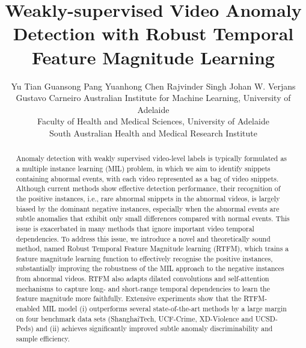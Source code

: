\documentclass[10pt,twocolumn,letterpaper]{article}
\begin{document}
\title{Weakly-supervised Video Anomaly Detection with Robust Temporal Feature Magnitude Learning} 

\author{\parbox{0.7\linewidth}{\centering Yu Tian      Guansong Pang  Yuanhong Chen     Rajvinder Singh  Johan W. Verjans   Gustavo Carneiro    Australian Institute for Machine Learning, University of Adelaide \\
  Faculty of Health and Medical Sciences, University of Adelaide
 \\
   South Australian Health and Medical Research Institute \\
} 
}
\maketitle
\ificcvfinal\thispagestyle{empty}\fi



\begin{abstract}
Anomaly detection with weakly supervised video-level labels is typically formulated as a multiple instance learning (MIL) problem, in which we aim to identify snippets containing abnormal events, with each video represented as a bag of video snippets. 
Although current methods show effective detection performance, their recognition of the positive instances, i.e., rare abnormal snippets in the abnormal videos, is largely biased by the dominant negative instances, especially when the abnormal events are subtle anomalies that exhibit only small differences compared with normal events.
This issue is exacerbated in many methods that ignore important video temporal dependencies. To address this issue, we introduce a novel and theoretically sound method, named Robust Temporal Feature Magnitude learning (RTFM), which trains a feature magnitude learning function to effectively recognise the positive instances, substantially improving the robustness of the MIL approach to the negative instances from abnormal videos. RTFM also adapts dilated convolutions and self-attention mechanisms to capture long- and short-range temporal dependencies to learn the feature magnitude more faithfully. 
Extensive experiments show that the RTFM-enabled MIL model (i) outperforms several state-of-the-art methods by a large margin on four benchmark data sets (ShanghaiTech, UCF-Crime, XD-Violence and UCSD-Peds) and (ii) achieves significantly improved subtle anomaly discriminability and sample efficiency.

\end{abstract}
\end{document}
